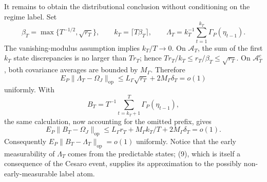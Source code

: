 It remains to obtain the distributional conclusion without conditioning on the regime label. Set
\[
 \beta_T=\max\{T^{-1/2},\sqrt{r_T}\},\qquad
 k_T=\lceil T\beta_T\rceil,\qquad
 \Lambda_T=k_T^{-1}\sum_{t=1}^{k_T}\Gamma_P(\eta_{t-1}).
\]
The vanishing-modulus assumption implies \(k_T/T\to0\). On \(\mathcal A_T\), the sum of the first \(k_T\) state discrepancies is no larger than \(Tr_T\); hence \(Tr_T/k_T\le r_T/\beta_T\le\sqrt{r_T}\). On \(\mathcal A_T^c\), both covariance averages are bounded by \(M_\Gamma\). Therefore
\[
 E_P\|\Lambda_T-\Omega_J\|_{\mathrm{op}}
 \le L_\Gamma\sqrt{r_T}+2M_\Gamma\delta_T=o(1)
\tag{9}
\]
uniformly. With
\[
 B_T=T^{-1}\sum_{t=k_T+1}^T\Gamma_P(\eta_{t-1}),
\]
the same calculation, now accounting for the omitted prefix, gives
\[
 E_P\|B_T-\Omega_J\|_{\mathrm{op}}
 \le L_\Gamma r_T+M_\Gamma k_T/T+2M_\Gamma\delta_T=o(1).
\tag{10}
\]
Consequently \(E_P\|B_T-\Lambda_T\|_{\mathrm{op}}=o(1)\) uniformly. Notice that the early measurability of \(\Lambda_T\) comes from the predictable states; (9), which is itself a consequence of the Cesaro event, supplies its approximation to the possibly non-early-measurable label atom.

